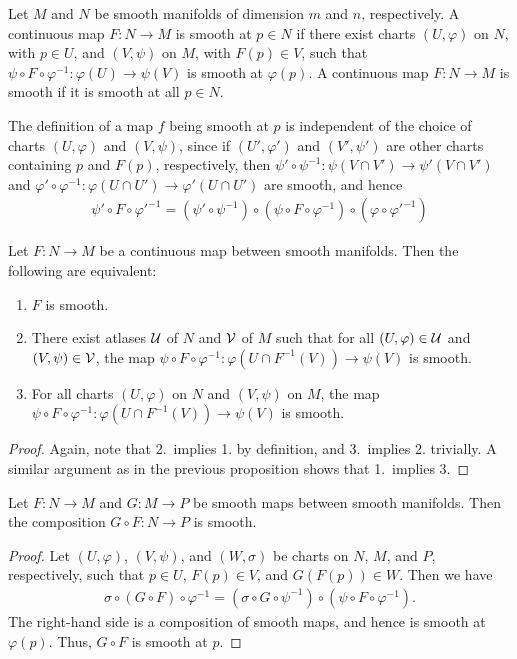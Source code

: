 \begin{definition}
    Let $M$ and $N$ be smooth manifolds of dimension $m$ and $n$, respectively. A continuous map $F:N \to M$ is smooth at $p \in N$ if there exist charts $(U,\varphi)$ on $N$, with $p \in U$, and $(V,\psi)$ on $M$, with $F(p) \in V$, such that $\psi \circ F \circ \varphi^{-1}:\varphi(U) \to \psi(V)$ is smooth at $\varphi(p)$. A continuous map $F:N \to M$ is smooth if it is smooth at all $p \in N$.
\end{definition}
The definition of a map $f$ being smooth at $p$ is independent of the choice of charts $(U,\varphi)$ and $(V,\psi)$, since if $(U',\varphi')$ and $(V',\psi')$ are other charts containing $p$ and $F(p)$, respectively, then $\psi' \circ \psi^{-1}:\psi(V \cap V') \to \psi'(V \cap V')$ and $\varphi' \circ \varphi^{-1}:\varphi(U \cap U') \to \varphi'(U \cap U')$ are smooth, and hence
\begin{align}
    \psi' \circ F \circ \varphi'^{-1} = (\psi' \circ \psi^{-1}) \circ (\psi \circ F \circ \varphi^{-1}) \circ (\varphi \circ \varphi'^{-1})
\end{align}

\begin{proposition}
    Let $F:N \to M$ be a continuous map between smooth manifolds. Then the following are equivalent:
    \begin{enumerate}
        \item $F$ is smooth.
        \item There exist atlases $\mathcal{U}$ of $N$ and $\mathcal{V}$ of $M$ such that for all $(U,\varphi) \in \mathcal{U}$ and $(V,\psi) \in \mathcal{V}$, the map $\psi \circ F \circ \varphi^{-1}:\varphi(U \cap F^{-1}(V)) \to \psi(V)$ is smooth.
        \item For all charts $(U,\varphi)$ on $N$ and $(V,\psi)$ on $M$, the map $\psi \circ F \circ \varphi^{-1}:\varphi(U \cap F^{-1}(V)) \to \psi(V)$ is smooth.
    \end{enumerate}
\end{proposition}

\begin{proof}
    Again, note that 2.~implies 1. by definition, and 3.~implies 2. trivially. A similar argument as in the previous proposition shows that 1.~implies 3.
\end{proof}

\begin{proposition}
    Let $F:N \to M$ and $G:M \to P$ be smooth maps between smooth manifolds. Then the composition $G \circ F:N \to P$ is smooth.
\end{proposition}
\begin{proof}
    Let $(U,\varphi)$, $(V,\psi)$, and $(W,\sigma)$ be charts on $N$, $M$, and $P$, respectively, such that $p \in U$, $F(p) \in V$, and $G(F(p)) \in W$. Then we have 
    \begin{align}
        \sigma \circ (G \circ F) \circ \varphi^{-1} = (\sigma \circ G \circ \psi^{-1}) \circ (\psi \circ F \circ \varphi^{-1}).
    \end{align}
    The right-hand side is a composition of smooth maps, and hence is smooth at $\varphi(p)$. Thus, $G \circ F$ is smooth at $p$.
\end{proof}

